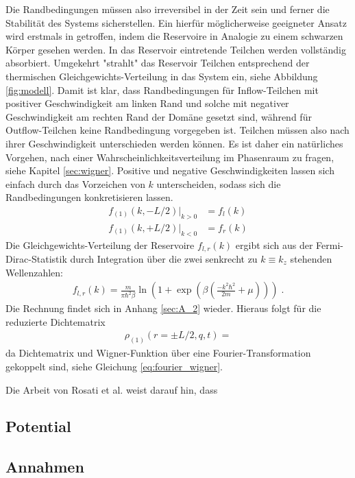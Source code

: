 Die Randbedingungen müssen also irreversibel in der Zeit sein und ferner die Stabilität des Systems sicherstellen. Ein hierfür möglicherweise geeigneter Ansatz wird erstmals in \cite{frensley2} getroffen, indem die Reservoire in Analogie zu einem schwarzen Körper gesehen werden. In das Reservoir eintretende Teilchen werden vollständig absorbiert. Umgekehrt "strahlt" das Reservoir Teilchen entsprechend der thermischen Gleichgewichts-Verteilung in das System ein, siehe Abbildung \ref{fig:modell}.
Damit ist klar, dass Randbedingungen für Inflow-Teilchen mit positiver Geschwindigkeit am linken Rand und solche mit negativer Geschwindigkeit am rechten Rand der Domäne gesetzt sind, während für Outflow-Teilchen keine Randbedingung vorgegeben ist. Teilchen müssen also nach ihrer Geschwindigkeit unterschieden werden können.
Es ist daher ein natürliches Vorgehen, nach einer Wahrscheinlichkeitsverteilung im Phasenraum zu fragen, siehe Kapitel \ref{sec:wigner}.
Positive und negative Geschwindigkeiten lassen sich einfach durch das Vorzeichen von $k$ unterscheiden, sodass sich die Randbedingungen konkretisieren lassen.
\begin{align}
  f_{(1)}(k,-L/2)|_{k>0} &= f_l({k}) \\
  f_{(1)}(k,+L/2)|_{k<0} &= f_r({k})
\end{align}
Die Gleichgewichts-Verteilung der Reservoire $f_{l,r}(k)$ ergibt sich aus der Fermi-Dirac-Statistik durch Integration über die zwei senkrecht zu $k\equiv k_z$ stehenden Wellenzahlen:
\begin{align}
  f_{l,r} (k) = \frac{m}{\pi\hbar^2\beta} \ln(1+\exp(\beta(\frac{- k^2\hbar^2}{2m} + \mu))) \; .
\end{align}
Die Rechnung findet sich in Anhang \ref{sec:A_2} wieder. Hieraus folgt für die reduzierte Dichtematrix
\begin{align}
  \rho_{(1)}(r=\pm L/2, q, t) =
\end{align}
da Dichtematrix und Wigner-Funktion über eine Fourier-Transformation gekoppelt sind, siehe Gleichung \eqref{eq:fourier_wigner}.

Die Arbeit von Rosati et al. \cite{failure} weist darauf hin, dass

\subsection{Potential}


\subsection{Annahmen}



